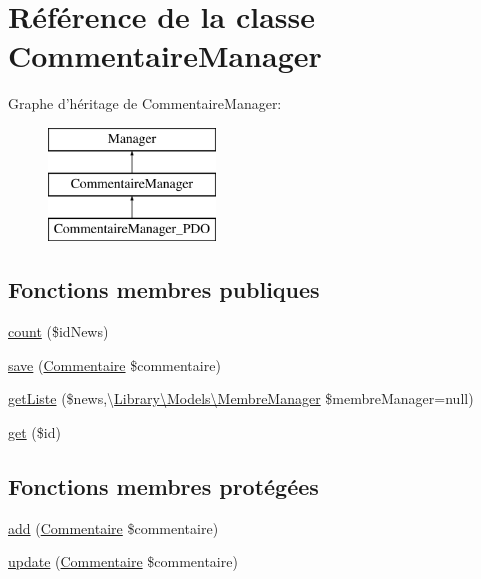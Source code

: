 \hypertarget{class_library_1_1_models_1_1_commentaire_manager}{\section{Référence de la classe Commentaire\+Manager}
\label{class_library_1_1_models_1_1_commentaire_manager}
}
Graphe d'héritage de Commentaire\+Manager\+:\begin{figure}[H]
\begin{center}
\leavevmode
\includegraphics[height=3.000000cm]{class_library_1_1_models_1_1_commentaire_manager}
\end{center}
\end{figure}
\subsection*{Fonctions membres publiques}
\begin{DoxyCompactItemize}
\item 
\hyperlink{class_library_1_1_models_1_1_commentaire_manager_aca7b2ef6da2d75355af20da41366eb1b}{count} (\$id\+News)
\item 
\hyperlink{class_library_1_1_models_1_1_commentaire_manager_a8655ef43f2ee06dd45f03bf05414aeaa}{save} (\hyperlink{class_library_1_1_entities_1_1_commentaire}{Commentaire} \$commentaire)
\item 
\hyperlink{class_library_1_1_models_1_1_commentaire_manager_a365ba4ecb8214c4f8ad9cddcc5291a0f}{get\+Liste} (\$news,\textbackslash{}\hyperlink{class_library_1_1_models_1_1_membre_manager}{Library\textbackslash{}\+Models\textbackslash{}\+Membre\+Manager} \$membre\+Manager=null)
\item 
\hyperlink{class_library_1_1_models_1_1_commentaire_manager_a50e3bfb586b2f42932a6a93f3fbb0828}{get} (\$id)
\end{DoxyCompactItemize}
\subsection*{Fonctions membres protégées}
\begin{DoxyCompactItemize}
\item 
\hyperlink{class_library_1_1_models_1_1_commentaire_manager_a061ee602fea7e6e7901bced121a867e1}{add} (\hyperlink{class_library_1_1_entities_1_1_commentaire}{Commentaire} \$commentaire)
\item 
\hyperlink{class_library_1_1_models_1_1_commentaire_manager_ad360efa5cec15a5eea694752003ab09b}{update} (\hyperlink{class_library_1_1_entities_1_1_commentaire}{Commentaire} \$commentaire)
\end{DoxyCompactItemize}
